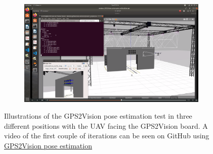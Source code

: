 \documentclass[../Head/report.tex]{subfiles}
\begin{document}
\begin{figure}[H]
\begin{subfigure}[t]{.30\textwidth}
        \caption{}
        \label{fig:GPS2Vision_pose_estimation_two}
    \end{subfigure}
        \hspace{0.2em}
    \begin{subfigure}[t]{.30\textwidth}
        \centering
        \includegraphics[width=\textwidth]{../Figures/GPS2Vision_pose_estimation_test/gps2vision_pose_estimation_three.png}
        \caption{}
        \label{fig:GPS2Vision_pose_estimation_three}
    \end{subfigure}
    \caption{Illustrations of the GPS2Vision pose estimation test in three different positions with the UAV facing the GPS2Vision board. A video of the first couple of iterations can be seen on GitHub using \href{https://github.com/Kenil16/master_project/tree/master/test_videos/analyse_GPS2Vision_aruco_pose_estimation}{GPS2Vision pose estimation}
 }
    \label{fig:GPS2Vision_pose_estimation}
\end{figure}
\end{document}
